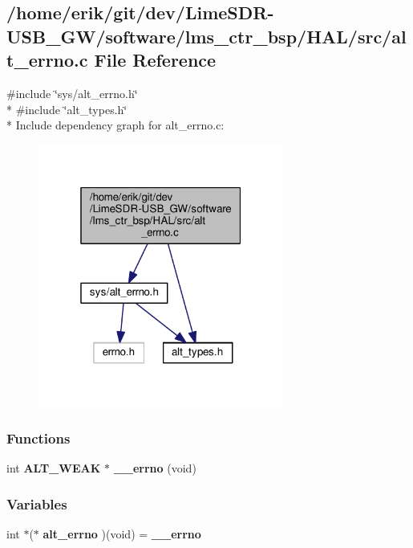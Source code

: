 \subsection{/home/erik/git/dev/\+Lime\+S\+D\+R-\/\+U\+S\+B\+\_\+\+G\+W/software/lms\+\_\+ctr\+\_\+bsp/\+H\+A\+L/src/alt\+\_\+errno.c File Reference}
\label{alt__errno_8c}
{\ttfamily \#include \char`\"{}sys/alt\+\_\+errno.\+h\char`\"{}}\\*
{\ttfamily \#include \char`\"{}alt\+\_\+types.\+h\char`\"{}}\\*
Include dependency graph for alt\+\_\+errno.\+c\+:
\nopagebreak
\begin{figure}[H]
\begin{center}
\leavevmode
\includegraphics[width=229pt]{d3/dc7/alt__errno_8c__incl}
\end{center}
\end{figure}
\subsubsection*{Functions}
\begin{DoxyCompactItemize}
\item 
int {\bf A\+L\+T\+\_\+\+W\+E\+AK} $\ast$ {\bf \+\_\+\+\_\+errno} (void)
\end{DoxyCompactItemize}
\subsubsection*{Variables}
\begin{DoxyCompactItemize}
\item 
int $\ast$($\ast$ {\bf alt\+\_\+errno} )(void) = {\bf \+\_\+\+\_\+errno}
\end{DoxyCompactItemize}


